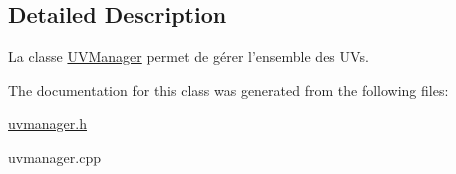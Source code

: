 \subsection{Detailed Description}
La classe \hyperlink{class_u_v_manager}{U\+V\+Manager} permet de gérer l'ensemble des U\+Vs. 

The documentation for this class was generated from the following files\+:\begin{DoxyCompactItemize}
\item 
\hyperlink{uvmanager_8h}{uvmanager.\+h}\item 
uvmanager.\+cpp\end{DoxyCompactItemize}
